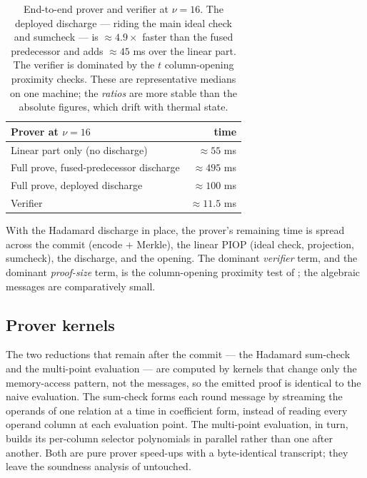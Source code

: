 \begin{table}[h]
\centering
\renewcommand{\arraystretch}{1.2}
\begin{tabular}{l r}
\toprule
Prover at $\nu=16$ & time \\
\midrule
Linear part only (no discharge) & $\approx 55$ ms \\
Full prove, fused-predecessor discharge & $\approx 495$ ms \\
Full prove, deployed discharge & $\approx 100$ ms \\
\midrule
Verifier & $\approx 11.5$ ms \\
\bottomrule
\end{tabular}
\caption{End-to-end prover and verifier at $\nu=16$. The deployed discharge
--- riding the main ideal check and sumcheck --- is $\approx 4.9\times$
faster than the fused predecessor and adds $\approx 45$ ms over the linear
part. The verifier is dominated by the $t$ column-opening proximity checks.
These are representative medians on one machine; the \emph{ratios} are more
stable than the absolute figures, which drift with thermal state.}
\end{table}

\begin{remark}
\label{rem:cost-structure}
With the Hadamard discharge in place, the prover's remaining time is spread
across the commit (encode $+$ Merkle), the linear PIOP (ideal check,
projection, sumcheck), the discharge, and the opening. The dominant
\emph{verifier} term, and the dominant \emph{proof-size} term, is the
column-opening proximity test of ; the algebraic
messages are comparatively small.
\end{remark}

\subsection{Prover kernels}
\label{sec:impl-kernels}

The two reductions that remain after the commit --- the Hadamard sum-check and
the multi-point evaluation --- are computed by kernels that change only the
memory-access pattern, not the messages, so the emitted proof is identical to
the naive evaluation. The sum-check forms each round message by streaming the
operands of one relation at a time in coefficient form, instead of reading
every operand column at each evaluation point. The multi-point evaluation, in
turn, builds its per-column selector polynomials in parallel rather than one
after another. Both are pure prover speed-ups with a byte-identical transcript;
they leave the soundness analysis of  untouched.

